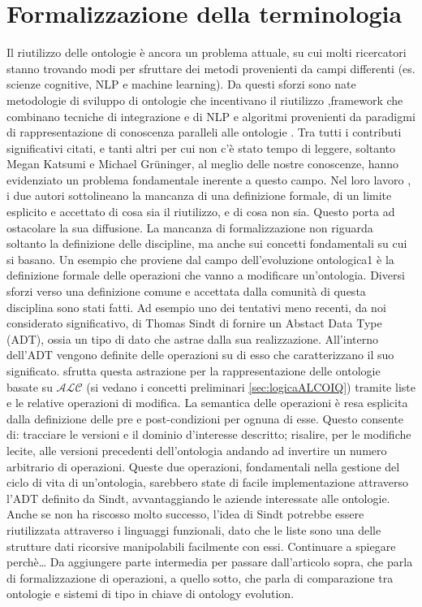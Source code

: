 \section{Formalizzazione della terminologia}
Il riutilizzo delle ontologie è ancora un problema attuale, su cui molti ricercatori stanno trovando modi per sfruttare dei metodi provenienti da campi differenti (es. scienze cognitive, NLP e machine learning). Da questi sforzi sono nate metodologie di sviluppo di ontologie che incentivano il riutilizzo \cite{...},framework che combinano tecniche di integrazione e di NLP \cite{...} e algoritmi provenienti da paradigmi di rappresentazione di conoscenza paralleli alle ontologie \cite{...}. Tra tutti i contributi significativi citati, e tanti altri per cui non c’è stato tempo di leggere, soltanto Megan Katsumi e Michael Grüninger, al meglio delle nostre conoscenze, hanno evidenziato un problema fondamentale inerente a questo campo. Nel loro lavoro \cite{...}, i due autori sottolineano la mancanza di una definizione formale, di un limite esplicito e accettato di cosa sia il riutilizzo, e di cosa non sia. Questo porta ad ostacolare la sua diffusione. La mancanza di formalizzazione non riguarda soltanto la definizione delle discipline, ma anche sui concetti fondamentali su cui si basano. Un esempio che proviene dal campo dell’evoluzione ontologica1 è la definizione formale delle operazioni che vanno a modificare un’ontologia. Diversi sforzi verso una definizione comune e accettata dalla comunità di questa disciplina sono stati fatti. Ad esempio uno dei tentativi meno recenti, da noi considerato significativo, di Thomas Sindt \cite{...} di fornire un Abstact Data Type (ADT), ossia un tipo di dato che astrae dalla sua realizzazione. All'interno dell'ADT vengono definite delle operazioni su di esso che caratterizzano il suo significato. \cite{...} sfrutta questa astrazione per la rappresentazione delle ontologie basate su $\mathcal{ALC}$ (si vedano i concetti preliminari \autoref{sec:logicaALCOIQ}) tramite liste e le relative operazioni di modifica. La semantica delle operazioni è resa esplicita dalla definizione delle pre e post-condizioni per ognuna di esse. Questo consente di:
tracciare le versioni e il dominio d’interesse descritto;
risalire, per le modifiche lecite, alle versioni precedenti dell’ontologia andando ad invertire un numero arbitrario di operazioni.
Queste due operazioni, fondamentali nella gestione del ciclo di vita di un’ontologia, sarebbero state di facile implementazione attraverso l’ADT definito da Sindt, avvantaggiando le aziende interessate alle ontologie. Anche se non ha riscosso molto successo, l’idea di Sindt potrebbe essere riutilizzata attraverso i linguaggi funzionali, dato che le liste sono una delle strutture dati ricorsive manipolabili facilmente con essi. Continuare a spiegare perchè…
Da aggiungere parte intermedia per passare dall’articolo sopra, che parla di formalizzazione di operazioni, a quello sotto, che parla di comparazione tra ontologie e sistemi di tipo in chiave di ontology evolution.


